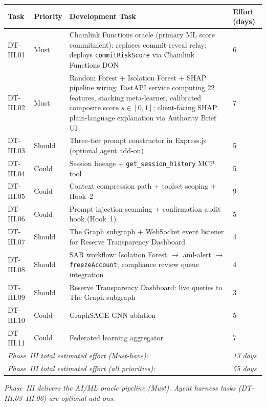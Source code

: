 \documentclass[12pt,a4paper]{report}
\newcommand{\tableheadcolor}{\rowcolor{TableHeadBg}}
\begin{document}
\begin{table}[H]
\centering
\begin{tabular}{p{1.8cm}p{1.8cm}p{7.5cm}p{1.5cm}}
\toprule
\tableheadcolor
\textbf{Task} & \textbf{Priority} & \textbf{Development Task} & \textbf{Effort (days)} \\
\midrule
DT-III.01 & Must & Chainlink Functions oracle (primary ML score commitment): replaces commit-reveal relay; deploys \texttt{commitRiskScore} via Chainlink Functions DON & 6 \\
DT-III.02 & Must & Random Forest + Isolation Forest + SHAP pipeline wiring: FastAPI service computing 22 features, stacking meta-learner, calibrated composite score $s \in [0,1]$; client-facing SHAP plain-language explanation via Authority Brief UI & 7 \\
DT-III.03 & Should & Three-tier prompt constructor in Express.js (optional agent add-on) & 5 \\
DT-III.04 & Could & Session lineage + \texttt{get\_session\_history} MCP tool & 5 \\
DT-III.05 & Could & Context compression path + toolset scoping + Hook~2 & 9 \\
DT-III.06 & Could & Prompt injection scanning + confirmation audit hook (Hook~1) & 5 \\
DT-III.07 & Should & The Graph subgraph + WebSocket event listener for Reserve Transparency Dashboard & 4 \\
DT-III.08 & Should & SAR workflow: Isolation Forest $\to$ aml-alert $\to$ \texttt{freezeAccount}; compliance review queue integration & 4 \\
DT-III.09 & Should & Reserve Transparency Dashboard: live queries to The Graph subgraph & 3 \\
DT-III.10 & Could & GraphSAGE GNN ablation & 5 \\
DT-III.11 & Could & Federated learning aggregator & 7 \\
\multicolumn{3}{l}{\textit{Phase~III total estimated effort (Must-have):}} & \textit{13 days} \\
\multicolumn{3}{l}{\textit{Phase~III total estimated effort (all priorities):}} & \textit{55 days} \\
\bottomrule
\end{tabular}
\end{table}

\vspace{2pt}
\noindent\textit{\small Phase~III delivers the AI/ML oracle pipeline (Must). Agent harness tasks (DT-III.03--III.06) are optional add-ons.}
\end{document}
